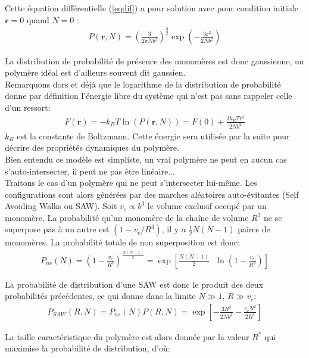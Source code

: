 Cette équation différentielle (\ref{eqdif}) a pour solution avec pour condition initiale $\textbf{r}=0$ quand $N=0$ :
\begin{eqnarray}
P(\textbf{r},N)=\left(\frac{3}{2\pi N b^2}\right)^\frac{3}{2}\exp\left(-\frac{3\textbf{r}^2}{2 N b^2}\right)
\end{eqnarray}

La distribution de probabilité de présence des monomères est donc gaussienne, un polymère idéal est d'ailleurs souvent dit gaussien.\\

Remarquons dors et déjà que le logarithme de la distribution de probabilité donne par définition l'énergie libre du système qui n'est pas sans rappeler celle d'un ressort:
\begin{eqnarray}
F(\textbf{r})= - k_B T \ln(P(\textbf{r},N))= F(0)+\frac{3k_BTr^2}{2Nb^2}
\label{elibre}
\end{eqnarray}
$k_B$ est la constante de Boltzmann. Cette énergie sera utilisée par la suite pour décrire des propriétés dynamiques du polymère.\\



Bien entendu ce modèle est simpliste, un vrai polymère ne peut en aucun cas s'auto-intersecter, il peut ne pas être linéaire...\\

 Traitons le cas d'un polymère qui ne peut s'intersecter lui-même. Les configurations sont alors générées par des marches aléatoires auto-évitantes (Self Avoiding Walks ou SAW). Soit $v_c \propto b^3$ le volume exclusif occupé par un monomère. La probabilité qu'un monomère de la chaîne de volume $R^3$ ne se superpose pas à un autre est $(1-v_c/R^3)$, il y a $\frac{1}{2}N(N-1)$ paires de monomères. La probabilité totale de non superposition est donc:
 \begin{eqnarray}
P_{ns}(N)= \left(1-\frac{v_c}{R^3}\right)^{\frac{N(N-1)}{2}} = \exp\left[\frac{N(N-1)}{2}\text{ }\ln\left(1-\frac{v_c}{R^3}\right)\right]
\end{eqnarray}

La probabilité de distribution d'une SAW est donc le produit des deux probabilités précédentes, ce qui donne dans la limite $N \gg 1$, $R \gg v_c$:
\begin{eqnarray}
P_{SAW}(R,N)=P_{ns}(N) P(R,N)=\exp\left[-\frac{3R^2}{2 N b^2}-\frac{v_cN^2}{2R^3}\right]
\end{eqnarray}

La taille caractéristique du polymère est alors donnée par la valeur $R^*$ qui maximise la probabilité de distribution, d'où:

